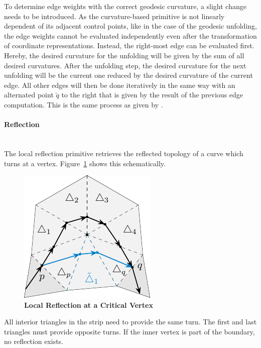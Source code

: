 \documentclass{stdlocal}
\begin{document}
  To determine edge weights with the correct geodesic curvature, a slight change needs to be introduced.
  As the curvature-based primitive is not linearly dependent of its adjacent control points, like in the case of the geodesic unfolding, the edge weights cannot be evaluated independently even after the transformation of coordinate representations.
  Instead, the right-most edge can be evaluated first.
  Hereby, the desired curvature for the unfolding will be given by the sum of all desired curvatures.
  After the unfolding step, the desired curvature for the next unfolding will be the current one reduced by the desired curvature of the current edge.
  All other edges will then be done iteratively in the same way with an alternated point $\tilde{q}$ to the right that is given by the result of the previous edge computation.
  This is the same process as given by \textcite{lawonn2014}.


  \paragraph{Reflection}\hfill\\
  The local reflection primitive retrieves the reflected topology of a curve which turns at a vertex.
  Figure~\ref{fig:local-reflection} shows this schematically.

  \begin{figure}
    \centering
    \includegraphics[width=0.45\linewidth]{figures/local-reflection.pdf}
    \caption[Local Reflection at a Critical Vertex]{%
      \textbf{Local Reflection at a Critical Vertex}\\
    }
    \label{fig:local-reflection}
  \end{figure}

  All interior triangles in the strip need to provide the same turn.
  The first and last triangles must provide opposite turns.
  If the inner vertex is part of the boundary, no reflection exists.
\end{document}
